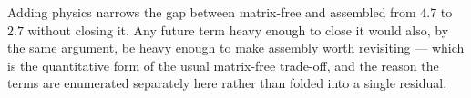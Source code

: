 \documentclass[11pt,a4paper]{article}
\begin{document}
Adding physics narrows the gap between matrix-free and assembled from $4.7$ to $2.7$ without
closing it. Any future term heavy enough to close it would also, by the same argument, be
heavy enough to make assembly worth revisiting --- which is the quantitative form of the
usual matrix-free trade-off, and the reason the terms are enumerated separately here rather
than folded into a single residual.
\end{document}
